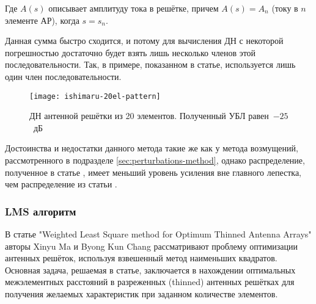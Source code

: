 Где $A(s)$ описывает амплитуду тока в решётке, причем $A(s)=A_n$ (току в $n$ элементе АР), когда $s=s_n$.

Данная сумма быстро сходится, и потому для вычисления ДН с некоторой погрешностью достаточно будет взять лишь
несколько членов этой последовательности. Так, в примере, показанном в статье, используется лишь
один член последовательности.

\begin{figure}[H]
    \centering
    \texttt{[image: ishimaru-20el-pattern]}
    \caption{ДН антенной решётки из 20 элементов. Полученный УБЛ равен~$-25$~дБ}%
    \label{fig:ishimaru-20el-pattern}
\end{figure}

Достоинства и недостатки данного метода такие же как у метода возмущений,
рассмотренного в подразделе \ref{sec:perturbations-method}, однако распределение, полученное в статье
\cite{ishimaru1962theory}, имеет меньший уровень усиления вне главного лепестка,
чем распределение из статьи \cite{harrington1961sidelobe}.

\subsubsection{LMS алгоритм}\label{sec:lms-algorithm}

В статье "Weighted Least Square method for Optimum Thinned Antenna Arrays" авторы Xinyu Ma и Byong Kun Chang
рассматривают проблему оптимизации антенных решёток, используя взвешенный метод наименьших квадратов. Основная
задача, решаемая в статье, заключается в нахождении оптимальных межэлементных расстояний в разреженных (thinned)
антенных решётках для получения желаемых характеристик при заданном количестве элементов.

